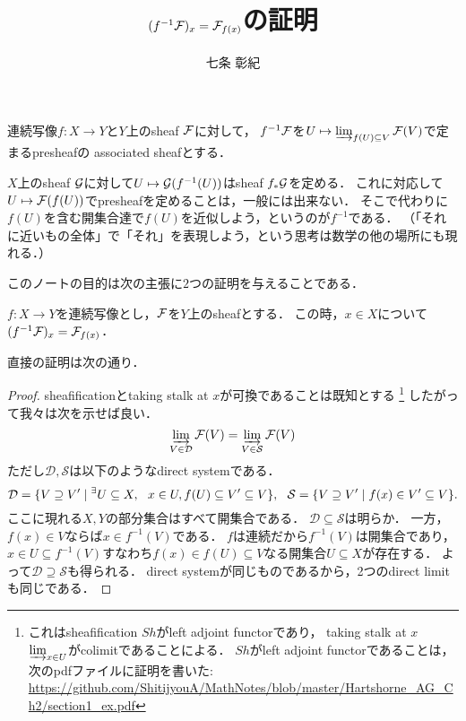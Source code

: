 \documentclass[a4paper]{jsarticle}
\title{$(f^{-1}\mathcal{F})_x=\mathcal{F}_{f(x)}$の証明}
\author{七条 彰紀}
\newcommand{\ftorSh}{\mathit{Sh}}
\begin{document}
\maketitle

\begin{Def}
    連続写像$f: X \to Y$と$Y$上のsheaf $\mathcal{F}$に対して，
    $f^{-1} \mathcal{F}$を$U \mapsto \varinjlim_{f(U) \subseteq V} \mathcal{F}(V)$で定まるpresheafの
    associated sheafとする．
\end{Def}

$X$上のsheaf $\mathcal{G}$に対して$U \mapsto \mathcal{G}(f^{-1}(U))$はsheaf $f_*\mathcal{G}$を定める．
これに対応して$U \mapsto \mathcal{F}(f(U))$でpresheafを定めることは，一般には出来ない．
そこで代わりに$f(U)$を含む開集合達で$f(U)$を近似しよう，というのが$f^{-1}$である．
（「それに近いもの全体」で「それ」を表現しよう，という思考は数学の他の場所にも現れる．）

このノートの目的は次の主張に$2$つの証明を与えることである．
\begin{Prop}[$*$]
    $f: X \to Y$を連続写像とし，$\mathcal{F}$を$Y$上のsheafとする．
    この時，$x \in X$について$(f^{-1}\mathcal{F})_x=\mathcal{F}_{f(x)}$．
\end{Prop}

直接の証明は次の通り．
\begin{proof}
    sheafificationとtaking stalk at $x$が可換であることは既知とする
    \footnote
    {
        これはsheafification $\ftorSh$がleft adjoint functorであり，
        taking stalk at $x$ $\varinjlim_{x \in U}$がcolimitであることによる．
        $\ftorSh$がleft adjoint functorであることは，
        次のpdfファイルに証明を書いた:
        \url{https://github.com/ShitijyouA/MathNotes/blob/master/Hartshorne_AG_Ch2/section1_ex.pdf}
    }
    したがって我々は次を示せば良い．
    \[ \varinjlim_{V \in \mathcal{D}} \mathcal{F}(V)=\varinjlim_{V \in \mathcal{S}} \mathcal{F}(V) \]
    ただし$\mathcal{D}, \mathcal{S}$は以下のようなdirect systemである．
    \[
        \mathcal{D}=\{ V \supseteq V' \mid {}^{\exists} U \subseteq X,~~ x \in U, f(U) \subseteq V' \subseteq V \},~~
        \mathcal{S}=\{ V \supseteq V' \mid f(x) \in V' \subseteq V \}.
    \]
    ここに現れる$X,Y$の部分集合はすべて開集合である．
    $\mathcal{D} \subseteq \mathcal{S}$は明らか．
    一方，$f(x) \in V$ならば$x \in f^{-1}(V)$である．
    $f$は連続だから$f^{-1}(V)$は開集合であり，
    $x \in U \subseteq f^{-1}(V)$すなわち$f(x) \in f(U) \subseteq V$なる開集合$U \subseteq X$が存在する．
    よって$\mathcal{D} \supseteq \mathcal{S}$も得られる．
    direct systemが同じものであるから，2つのdirect limitも同じである．
\end{proof}
\end{document}
